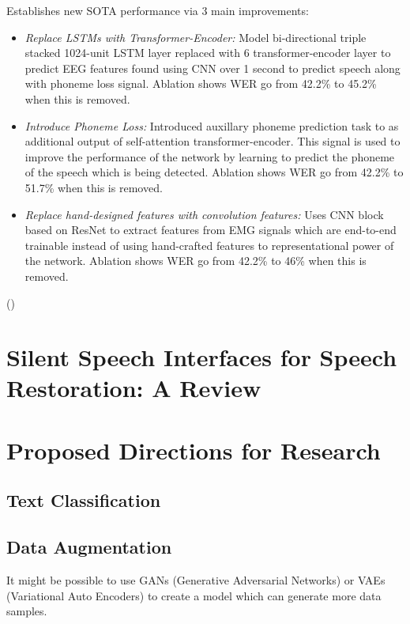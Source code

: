 Establishes new SOTA performance via 3 main improvements:

\begin{itemize}
  \item \emph{Replace LSTMs with Transformer-Encoder:}
  Model bi-directional triple stacked 1024-unit LSTM layer replaced with 6 transformer-encoder
  layer to predict EEG features found using CNN over 1 second to predict speech along with
  phoneme loss signal.
  Ablation shows WER go from 42.2\% to 45.2\% when this is removed.
  \item \emph{Introduce Phoneme Loss:}
  Introduced auxillary phoneme prediction task to as additional 
  output of self-attention transformer-encoder. This signal is used to improve the performance
  of the network by learning to predict the phoneme of the speech which is being detected.
  Ablation shows WER go from 42.2\% to 51.7\% when this is removed.
  \item \emph{Replace hand-designed features with convolution features:}
  Uses CNN block based on ResNet to extract features from EMG signals which are end-to-end
  trainable instead of using hand-crafted features to representational power of the network.
  Ablation shows WER go from 42.2\% to 46\% when this is removed.
\end{itemize}

(\cite{digital_voicing_2021})

\section{Silent Speech Interfaces for Speech Restoration: A Review}

\section{Proposed Directions for Research}

\subsection{Text Classification}

\subsection{Data Augmentation}

It might be possible to use GANs (Generative Adversarial Networks) or
VAEs (Variational Auto Encoders) to create a model which can generate
more data samples.

